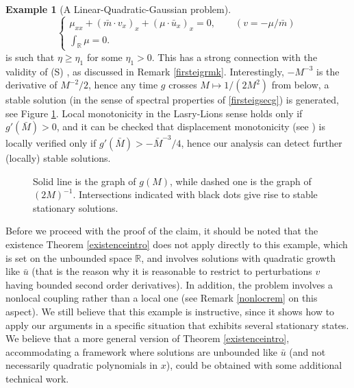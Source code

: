 \documentclass[10pt,a4paper,nouppercase,nowrite]{article}
\numberwithin{equation}{section}
\newcommand{\Sp}{{\textsc (S)} }
\newcommand{\R}{\mathbb{R}}
\theoremstyle{definition}
\newtheorem{exmpl}[defn]{Example}
\begin{document}
\begin{exmpl}[A Linear-Quadratic-Gaussian problem]
\begin{equation}
\begin{cases}
			\mu_{xx} + (\bar m\cdot v_x)_x + (\mu \cdot \bar u_x)_x = 0, \qquad (v = -\mu/\bar m)  \\
			 \int_\R \mu = 0.
		\end{cases}
	\end{equation}
is such that $\eta \ge \eta_1$ for some $\eta_1 > 0$. This has a strong connection with the validity of \Sp, as discussed in Remark \ref{firsteigrmk}. Interestingly, $-M^{-3}$ is the derivative of $M^{-2}/2$, hence any time $g$ crosses $M \mapsto 1/(2M^2)$ from below, a stable solution (in the sense of spectral properties of \eqref{firsteigsecg}) is generated, see Figure \ref{ggraph}. Local monotonicity in the Lasry-Lions sense holds only if $g'(\bar M) > 0$, and it can be checked that displacement monotonicity (see \cite{CM24}) is locally verified only if $g'(\bar M) > -\bar M^{-3}/4$, hence our analysis can detect further (locally) stable solutions.

\begin{figure}
\centering
{}
\caption{Solid line is the graph of $g(M)$, while dashed one is the graph of $(2M)^{-1}$. Intersections indicated with black dots give rise to stable stationary solutions.}\label{ggraph}
\end{figure}

Before we proceed with the proof of the claim, it should be noted that the existence Theorem \ref{existenceintro} does not apply directly to this example, which is set on the unbounded space $\R$, and involves solutions with quadratic growth like $\bar u$ (that is the reason why it is reasonable to restrict to perturbations $v$ having bounded second order derivatives). In addition, the problem involves a nonlocal coupling rather than a local one (see Remark \ref{nonlocrem} on this aspect). We still believe that this example is instructive, since it shows how to apply our arguments in a specific situation that exhibits several stationary states. We believe that a more general version of Theorem \ref{existenceintro}, accommodating a framework where solutions are unbounded like $\bar u$ (and not necessarily quadratic polynomials in $x$), could be obtained with some additional technical work.


\end{exmpl}
\end{document}
